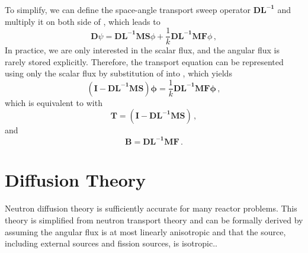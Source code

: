 To simplify, we can define the space-angle transport sweep operator $\mathbf{DL^{-1}}$ and multiply it on both side of , which leads to
\begin{equation}
  \mathbf{D} \psi =  \mathbf{DL^{-1}MS}\phi + \frac{1}{k} \mathbf{DL^{-1}MF} \phi  \, ,
 \label{eq:operatortrans}
\end{equation}
In practice, we are only interested in the scalar flux, and the angular flux is rarely stored explicitly. Therefore, the transport equation can be represented using only the scalar flux by substitution of  into , which yields
\begin{equation}
  \mathbf{(I - DL^{-1}MS)} \mathbf{\phi} = \frac{1}{k} \mathbf{DL^{-1}MF} \mathbf{\phi}  \, ,
 \label{eq:keig}
\end{equation}
which is equivalent to  with
\begin{equation}
  \mathbf{T} = \mathbf{(I - DL^{-1}MS)}  \, ,
 \label{eq:AG}
\end{equation}
 and 
\begin{equation}
  \mathbf{B} = \mathbf{DL^{-1}MF}  \, .
 \label{eq:B}
\end{equation}

\section{Diffusion Theory}
Neutron diffusion theory is sufficiently accurate for many reactor problems.
This theory is simplified from neutron transport theory and can be formally derived by assuming the angular flux is at most linearly anisotropic and that the source, including external sources and fission sources, is isotropic.\cite{stacey2018nuclear}.

